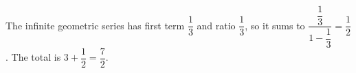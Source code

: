 The infinite geometric series has first term $\dfrac{1}{3}$ and ratio $\dfrac{1}{3}$, so it sums to $\dfrac{\dfrac{1}{3}}{1-\dfrac{1}{3}}=\dfrac{1}{2}$. The total is $3+\dfrac{1}{2}=\boxed{\dfrac{7}{2}}$.
